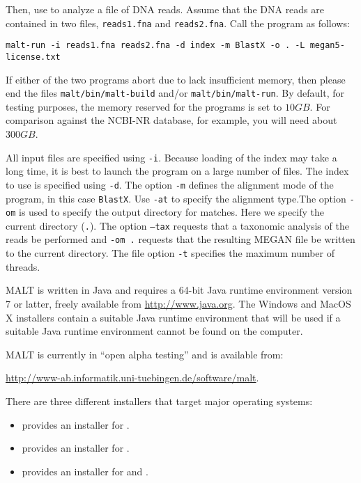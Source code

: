 \documentclass[11pt]{article}
\newcommand\MALT{{\sf MALT}\xspace}
\begin{document}
Then, use  to analyze a file of DNA reads. Assume that the DNA reads are
contained in two files, {\tt reads1.fna} and {\tt reads2.fna}. Call the program as follows:
{\footnotesize
\begin{verbatim}
malt-run -i reads1.fna reads2.fna -d index -m BlastX -o . -L megan5-license.txt
\end{verbatim}
}

If either of the two programs abort due to lack insufficient memory, then please end the files {\tt malt/bin/malt-build} and/or {\tt malt/bin/malt-run}.
By default, for testing purposes, the memory reserved for the programs is set to $10GB$. 
For comparison against the NCBI-NR database, for example, you will  need about $300GB$.

All input files are specified using {\tt -i}. Because loading of the index may take a long time, it is best to launch the program on a large
number of files. The index to use is specified using {\tt -d}. The option {\tt -m} defines the alignment mode of the program, in this
case {\tt BlastX}. Use {\tt -at} to specify the alignment type.The option {\tt -om} is used to specify the output directory for matches.
Here we specify the current directory ({\tt .}). The option {\tt --tax} requests that a taxonomic analysis of the reads be performed and {\tt -om .}
requests that the resulting MEGAN file be written to the current directory.
The file option {\tt -t} specifies the maximum number of threads.


\MALT is written in Java and requires a 64-bit Java runtime environment
version 7 or latter, freely available from \url{http://www.java.org}.
The Windows and MacOS X installers contain a suitable Java runtime environment that will be used if
a suitable Java runtime environment cannot be found on the computer.

\MALT is currently in ``open alpha testing'' and is available from:

\url{http://www-ab.informatik.uni-tuebingen.de/software/malt}.

There are three different installers that target major operating systems:
\begin{itemize}
\item {} provides an installer  for .
\item {} provides an installer for .
\item {} provides an installer for  and  .
\end{itemize}
\end{document}
